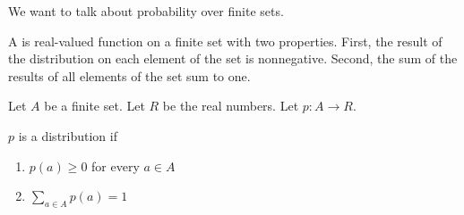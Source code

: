 
\sbasic














\sstart
{}


We want to talk about
probability over finite
sets.


A 
is real-valued function on a finite
set with two properties. First, the result
of the distribution on each element of the
set is nonnegative.
Second, the sum of the results of all
elements of the set sum to one.


Let $A$ be a finite set.
Let $R$ be the real numbers.
Let $p: A \to R$.

$p$ is a distribution if
\begin{enumerate}
  \item $p(a) \geq 0$ for every $a \in A$
  \item $\sum_{a \in A} p(a) = 1$
\end{enumerate}
\strats

